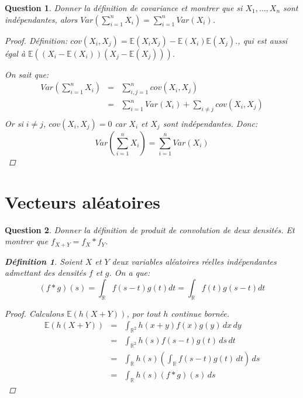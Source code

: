 \documentclass{article}
\theoremstyle{plain}
\newtheorem{question}{Question}
\theoremstyle{definition}
\newtheorem{definition}{Définition}
\begin{document}
\begin{question}
	Donner la définition de covariance et montrer que si $X_1, \dots, X_n$ sont indépendantes, alors $Var(\sum_{i=1}^n X_i) = \sum_{i=1}^n Var(X_i)$.
	\begin{proof}
		Définition: $cov(X_i, X_j) = \mathbb{E} (X_iX_j) - \mathbb{E} (X_i) \mathbb{E} (X_j)$., qui est aussi égal à $\mathbb{E} ((X_i - \mathbb{E} (X_i))(X_j - \mathbb{E} (X_j)))$.

		On sait que:
		\begin{eqnarray*}
			Var(\sum_{i=1}^n X_i) &=& \sum_{i,j=1}^n cov(X_i, X_j) \\
			&=& \sum_{i=1}^n Var(X_i) + \sum_{i \neq j} cov(X_i, X_j) \\
		\end{eqnarray*}
		Or si $i \neq j$, $cov(X_i, X_j) = 0$ car $X_i$ et $X_j$ sont indépendantes. Donc:
		\begin{equation*}
			Var(\sum_{i=1}^n X_i) = \sum_{i=1}^n Var(X_i)
		\end{equation*}

	\end{proof}
\end{question}

\section{Vecteurs aléatoires}

\begin{question}
	Donner la définition de produit de convolution de deux densités. Et montrer que
	$f_{X+Y} = f_X * f_Y$.
	\begin{definition}
		Soient $X$ et $Y$ deux variables aléatoires réelles indépendantes admettant des densités $f$ et $g$.
		On a que:
		\begin{equation*}
			(f * g)(s) = \int_{\mathbb{R}} f (s - t)g(t) dt = \int_{\mathbb{R}} f (t)g(s - t) dt
		\end{equation*}
	\end{definition}
	\begin{proof}
		Calculons $\mathbb{E}(h(X+Y))$, por tout $h$ continue bornée.
		\begin{eqnarray*}
			\mathbb{E}(h(X+Y)) &=& \int_{\mathbb{R}^2} h(x + y) f(x)g(y)\, dx \, dy \\
			&=& \int_{\mathbb{R}^2} h(s) f(s - t)g(t)\, ds \, dt \\
			&=& \int_{\mathbb{R}} h(s) \left( \int_{\mathbb{R}}  f(s-t)g(t)\, dt \right)\, ds \\
			&=& \int_{\mathbb{R}} h(s) (f * g)(s)\, ds
		\end{eqnarray*}
	\end{proof}
\end{question}
\end{document}
